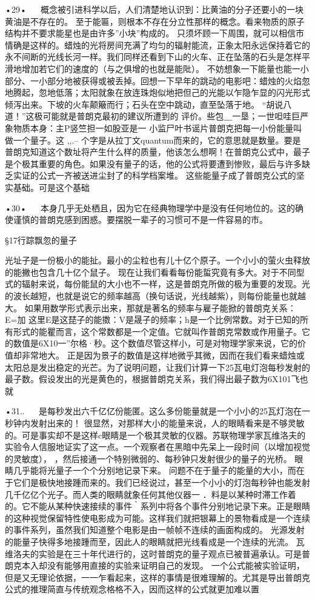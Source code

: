 •29•
  
概念被引进科学以后，人们清楚地认识到：比黄油的分子还要小的一块黄油是不存在的。
至于能匾，则根本不存在分立性那样的概念。看来物质的原子结构并不要求能星也是由许多”小块”构成的。
只须坏顾一下周围，就可以相信市情确是这样的。蜡烛的光将房间充满了均匀的辐射能流，正象太阳永远保持着它的永不间断的光线长河一样。我们同样还看到下山的火车、正在坠落的石头是怎样平滑地增加若它们的速度的（与之俱增的也就是能阰）。
不妨想象一下能量也能一小部分、一小部分地被获得或被丢掉。回想一下早年的跳动的电影吧：蜡烛的火焰忽地腾起，忽地低落；太阳就象在放连珠炮似地把但己的光能以乍隐乍显的闪光形式倾泻出来。下坡的火车颠簸而行；石头在空中跳动，直至坠落于地。
“胡说八道！”这极可能就是普朗克最初的建议所遭到的
评价。些包＿一垦；一世呾哇巨严象物质本身：主P竖竺担一如股亚是一
小监尸叶书谣片普朗克把每一小份能量叫做一个量子。这
,,.--
个字是从拉丁文quantum而来的，它的意思就是数量。要是
普朗克知道这个数址将产生什么样的质量，他该怎么想啊！在普朗克公式中，最子是个极其重要的角色。如果没有量子的话，他的公式将要遭到惨败，最后与许多缺乏实证的公式一齐被送进尘封了的科学档案堆。
这些能量子成了普朗克公式的坚实基础。可是这个基础

•30•
  
本身几乎无处栖且，因为它在经典物理学中是没有任何地位的。这的确使谨慎的普朗克感到困惑。要摆脱一辈子的习惯可不是一件容易的市。

§17行踪飘忽的量子

光址子是一份极小的能扯。最小的尘粒也有儿十亿个原子。一个小小的萤火虫释放的能撇也包含几十亿个鼠子。
现在让我们看看每份能蜇究竟有多大。对于不同型式的辐射来说，每份能鼠的大小也不一样，这是普朗克所做的极为重要的发现。光的波长越短，也就是说它的频率越高（换句话说，光线越紫），则每份能量也就越大。
如果用数学形式表示出来，那就是著名的频率与雇子能掀的普朗克关系：
E=加
这里E是这琵子的能擞：V是晟子的频率；h是一个比例常数。对于已知的所有形式的能瞿而言，这个常数都是一个定值。它就叫作普朗克常数或作用量子。它的数值是6X10一”尔格·秒。这个数值尽管这样小，可是对物理学家来说，它的价值却非常地大。
正是因为景子的数值是这样地微乎其微，因而在我们看来蜡烛或太阳总是发出稳定的光芒。为了说明问题，让我们计算一下25瓦电灯泡每秒发射的最子数。假设发出的光是黄色的，根据普朗克关系，我们得出最子数为6X101飞也就

•31..
  
是每秒发出六千亿亿份能匿。这么多份能量就是一个小小的25瓦灯泡在一秒钟内发射出来的！
很显然，对那样大小的能量来说，人的眼睛看来是不够灵敏的。可是事实却不是这样c眼睛是一个极其灵敏的仪器。苏联物理学家瓦维洛夫的实验令人信服地证实了这一点。一个观察者在黑暗中先呆上一段时间（以增加视觉的灵敏度），
，然后接通一个特别微弱的、每秒钟只发射很少的量子的光桥。
眼睛几乎能将光量子一个个分别地记录下来。
问题不在于量子的能量的大小，而在于它们是极快地接踵而来的。我们已经说过，甚至一个小小的灯泡每秒钟也能发射几千亿亿个光子。而人类的眼睛就象任何其他仪器一
．料是以某种时滞工作着的。它不能从某种快速接续的事件｀系列中将各个事件分别地记录下来。正是眼睛的这种视觉保留特性使电影成为可能。这样我们就把银幕上的景物看成是一个连续的事件系列，虽然我们知道整个电影是由一帧帧不连续的画面构成的。
光源发射的能量子快得多地接踵而至，因此人的眼睛就把光线看成是一个连续的光流。
瓦维洛夫的实验是在三十年代进行的，这时普朗克的量子观点已被普遍承认。可是普朗克本入却没有能够用直接的实验来证明自己的发现。
一个公式能被实验证明，但是又无理论依据，一一乍看起来，这样的事情是很难理解的。尤其是导出普朗克公式的推理简直与传统观念格格不入，因而这样的公式就更加难以置

